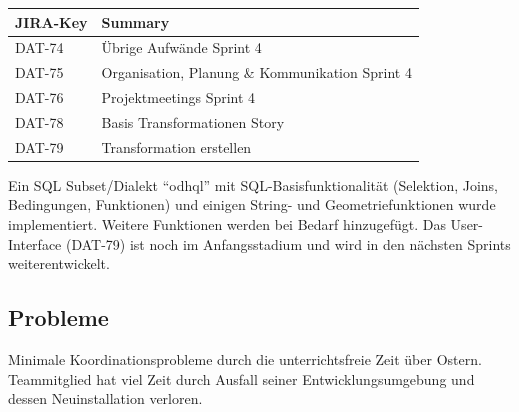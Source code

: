 \begin{table}[H]	
\centering
\begin{tabular}{ll}
	\toprule
	\textbf{JIRA-Key} & \textbf{Summary}\\
	\midrule
DAT-74 & Übrige Aufwände Sprint 4\\
DAT-75 & Organisation, Planung \& Kommunikation Sprint 4\\
DAT-76 & Projektmeetings Sprint 4\\
DAT-78 & Basis Transformationen	Story\\
DAT-79 & Transformation erstellen\\
	\bottomrule
\end{tabular}	
\end{table}

Ein SQL Subset/Dialekt ``\acs{odhql}'' mit SQL-Basisfunktionalität (Selektion, Joins, Bedingungen, Funktionen) und einigen String- und Geometriefunktionen wurde implementiert. Weitere Funktionen werden bei Bedarf hinzugefügt. Das User-Interface (DAT-79) ist noch im Anfangsstadium und wird in den nächsten Sprints weiterentwickelt.

\subsection*{Probleme}
Minimale Koordinationsprobleme durch die unterrichtsfreie Zeit über Ostern. Teammitglied \rlif hat viel Zeit durch Ausfall seiner Entwicklungsumgebung und dessen Neuinstallation verloren.
